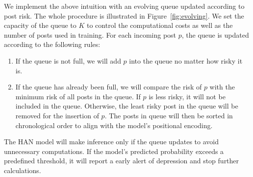 We implement the above intuition with an evolving queue updated according to 
post risk. The whole procedure is illustrated in Figure~\ref{fig:evolving}. 
We set the capacity of the queue to $K$ to control the computational costs 
as well as the number of posts used in training. 
For each incoming post $p$, the queue is updated according to the 
following rules: 
\begin{enumerate}
    \item If the queue is not full, we will add $p$ into the queue no matter how risky it is.
    \item If the queue has already been full, we will compare the risk of $p$ with the minimum risk of all posts in the queue. If $p$ is less risky, it will not be included in the queue. Otherwise, the least risky post in the queue will be removed for the insertion of $p$. The posts in queue will then be sorted in chronological order to align with the model's positional encoding.
\end{enumerate}

The HAN model will make inference only if the queue updates to avoid unnecessary computations. If the model's predicted probability exceeds a predefined threshold, it will report a early alert of depression and stop further calculations.

